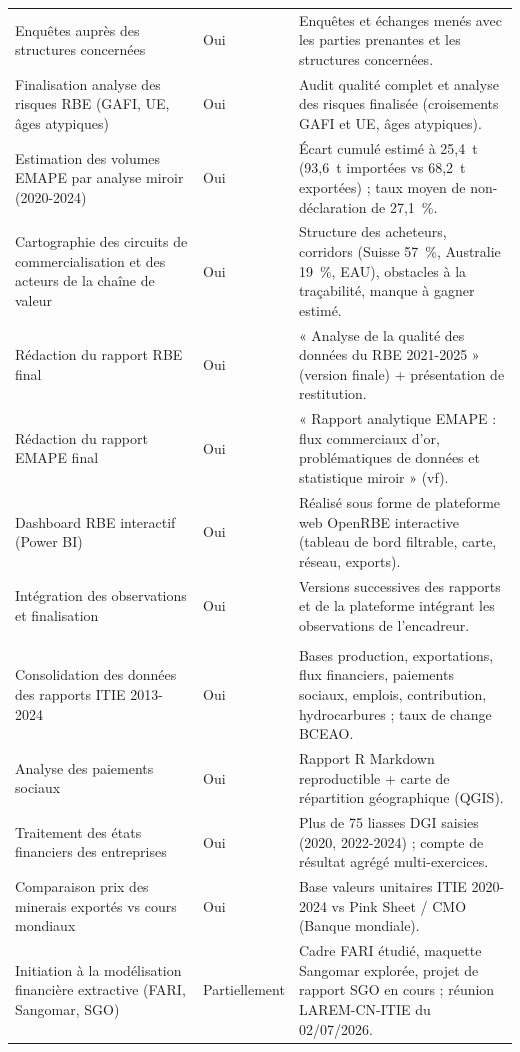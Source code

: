 \documentclass[12pt, a4paper]{article}
\newcommand{\sousentete}{\rowcolor{ensaerow}}
\begin{document}
\begin{small}
\begin{singlespace}
\begin{longtable}{p{5.2cm}p{2.1cm}p{6.6cm}}
  Enquêtes auprès des structures concernées & Oui & Enquêtes et échanges menés avec les parties prenantes et les structures concernées.\\
  Finalisation analyse des risques RBE (GAFI, UE, âges atypiques) & Oui & Audit qualité complet et analyse des risques finalisée (croisements GAFI et UE, âges atypiques).\\
  Estimation des volumes EMAPE par analyse miroir (2020-2024) & Oui & Écart cumulé estimé à 25,4~t (93,6~t importées vs 68,2~t exportées) ; taux moyen de non-déclaration de 27,1~\%.\\
  Cartographie des circuits de commercialisation et des acteurs de la chaîne de valeur & Oui & Structure des acheteurs, corridors (Suisse 57~\%, Australie 19~\%, EAU), obstacles à la traçabilité, manque à gagner estimé.\\
  Rédaction du rapport RBE final & Oui & « Analyse de la qualité des données du RBE 2021-2025 » (version finale) + présentation de restitution.\\
  Rédaction du rapport EMAPE final & Oui & « Rapport analytique EMAPE : flux commerciaux d'or, problématiques de données et statistique miroir » (vf).\\
  Dashboard RBE interactif (Power BI) & Oui & Réalisé sous forme de plateforme web OpenRBE interactive (tableau de bord filtrable, carte, réseau, exports).\\
  Intégration des observations et finalisation & Oui & Versions successives des rapports et de la plateforme intégrant les observations de l'encadreur.\\
  \sousentete \multicolumn{3}{l}{Travaux complémentaires (hors cahier des charges)}\\
  Consolidation des données des rapports ITIE 2013-2024 & Oui & Bases production, exportations, flux financiers, paiements sociaux, emplois, contribution, hydrocarbures ; taux de change BCEAO.\\
  Analyse des paiements sociaux & Oui & Rapport R Markdown reproductible + carte de répartition géographique (QGIS).\\
  Traitement des états financiers des entreprises & Oui & Plus de 75 liasses DGI saisies (2020, 2022-2024) ; compte de résultat agrégé multi-exercices.\\
  Comparaison prix des minerais exportés vs cours mondiaux & Oui & Base valeurs unitaires ITIE 2020-2024 vs Pink Sheet / CMO (Banque mondiale).\\
  Initiation à la modélisation financière extractive (FARI, Sangomar, SGO) & Partiellement & Cadre FARI étudié, maquette Sangomar explorée, projet de rapport SGO en cours ; réunion LAREM-CN-ITIE du 02/07/2026.\\

\end{longtable}
\end{singlespace}
\end{small}
\end{document}
